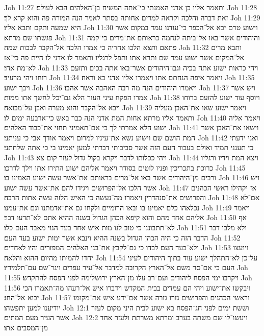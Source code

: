 Joh 11:27  ותאמר אליו כן אדני האמנתי כי־אתה המשיח בן־האלהים הבא לעולם׃
Joh 11:28  זאת דברה והלכה וקראה למרים אחותה בסתר לאמר הנה המורה פה והוא קרא לך׃
Joh 11:29  היא שמעה ותקם ותבא אליו׃
Joh 11:30  וישוע טרם יבא אל־הכפר כי־עודנו עמד במקום אשר פגשתו־שם מרתא׃
Joh 11:31  והיהודים אשר־באו אל־ביתה לנחמה כראותם את־מרים כי־קמה פתאם ותצא הלכו אחריה כי אמרו הלכה אל־הקבר לבכות שמה׃
Joh 11:32  ותבא מרים אל־המקום אשר ישוע עמד שם ותרא אתו ותפל לרגליו ותאמר לו אדני לו היית פה כי־אז לא־מת אחי׃
Joh 11:33  ויהי כראות ישוע אתה בכיה וגם־היהודים אשר־באו אתה בכים ותזעם רוחו ויהי מרעיד׃
Joh 11:34  ויאמר איפה הנחתם אתו ויאמרו אליו אדני בא וראה׃
Joh 11:35  ויבך ישוע׃
Joh 11:36  ויאמרו היהודים הנה מה רבה האהבה אשר אהבו׃
Joh 11:37  ויש אשר אמרו הפקח עיני העור הלא גם־יכל לחשך אתו ממות׃
Joh 11:38  ויוסף עוד ישוע להזעם ברוחו ויבא אל־הקבר והוא מערה ואבן על־מבואה׃
Joh 11:39  ויאמר ישוע שאו את־האבן מעליה ותאמר אליו מרתא אחות המת אדני הנה כבר באש כי־ארבעה ימים לו׃
Joh 11:40  ויאמר אליה ישוע הלא אמרתי לך כי אם־תאמיני תחזי את־כבוד האלהים׃
Joh 11:41  וישאו את־האבן אשר המת הושם שם וישוע נשא את־עיניו למרום ויאמר אודך אבי כי עניתני׃
Joh 11:42  ואני ידעתי כי תענני תמיד ואולם בעבור העם הזה אשר סביבותי דברתי למען יאמינו בי כי אתה שלחתני׃
Joh 11:43  ויהי ככלותו לדבר ויקרא בקול גדול לעזר קום צא׃
Joh 11:44  ויצא המת וידיו ורגליו כרוכת בתכריכין ופניו לוטים בסודר ויאמר אליהם ישוע התירו אתו וילך לדרכו׃
Joh 11:45  ורבים מן־היהודים אשר באו אל־מרים בראותם את־אשר עשה ישוע האמינו בו׃
Joh 11:46  ויש אשר הלכו אל־הפרושים ויגידו להם את־אשר עשה ישוע׃
Joh 11:47  אז יקהילו ראשי הכהנים והפרושים את־סנהדרין ויאמרו מה־נעשה כי האיש הלזה עשה אתות הרבה׃
Joh 11:48  אם־לא נכלאהו כלם יאמינו בו ובאו הרומיים ולקחו גם את־אדמתנו וגם את־עמנו׃
Joh 11:49  ויאמר אליהם אחד מהם והוא קיפא הכהן הגדול בשנה ההיא אתם לא־תדעו דבר׃
Joh 11:50  אף לא־תתבוננו כי טוב לנו מות איש אחד בעד הגוי מאבד העם כלו׃
Joh 11:51  ולא מלבו דבר הדבר הזה כי היה הכהן הגדול בשנה ההיא וינבא אשר ימות ישוע בעד העם׃
Joh 11:52  ולא־בעד העם לבדו כי גם־לקבץ את־בני האלהים המפזרים והיו לאחדים׃
Joh 11:53  ויועצו יחדו להמיתו מהיום ההוא והלאה׃
Joh 11:54  על־כן לא־התהלך ישוע עוד בתוך היהודים לעיני העם כי אם־סר משם אל־הארץ הקרובה למדבר אל־עיר עפרים ויגר־שם עם־תלמידיו׃
Joh 11:55  ויקרבו ימי הפסח ליהודים ועם־רב עלו מן־הארץ ירושלימה לפני הפסח להתקדש׃
Joh 11:56  ויבקשו את־ישוע ויהי הם עמדים בבית המקדש וידברו איש אל־רעהו מה־תאמרו הכי יבוא אל־החג׃
Joh 11:57  וראשי הכהנים והפרושים גזרו גזרה אשר אם־ידע איש את־מקומו יודיענו למען יתפשהו׃
Joh 12:1  וששת ימים לפני חג־הפסח בא ישוע לבית היני מקום לעזר אשר העיר מעם המתים׃
Joh 12:2  ויעשו־לו שם משתה בערב ומרתא משרתת ולעזר אחד מן־המסבים אתו׃

